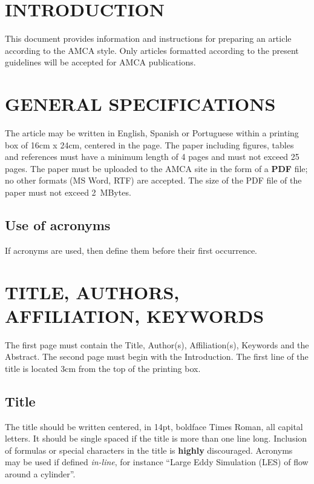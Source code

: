 \documentclass[oneside,a4paper,english,links]{amca}
\begin{document}
\section{INTRODUCTION}
This document provides information and instructions for preparing an
article according to the AMCA style. Only articles formatted according to
the present guidelines will be accepted for AMCA publications. 

\section{GENERAL SPECIFICATIONS}

The article may be written in English, Spanish or Portuguese within a
printing box of 16cm x 24cm, centered in the page. The paper including
figures, tables and references must have a minimum length of 4 pages
and must not exceed 25 pages. The paper must be uploaded to the AMCA
site in the form of a \textbf{PDF} file; no other formats (MS Word,
RTF) are accepted. The size of the PDF file of the paper must not
exceed 2~MBytes.

\subsection{Use of acronyms}

If acronyms are used, then define them before their first
occurrence. 

\section{TITLE, AUTHORS, AFFILIATION, KEYWORDS}

The first page must contain the Title, Author(s), Affiliation(s),
Keywords and the Abstract. The second page must begin with the
Introduction. The first line of the title is located 3cm from the top
of the printing box. 

\subsection{Title}

The title should be written centered, in 14pt, boldface Times Roman,
all capital letters. It should be single spaced if the title is more
than one line long. Inclusion of formulas or special characters in the
title is \textbf{highly} discouraged. Acronyms may be used if defined
\emph{in-line}, for instance ``Large Eddy Simulation (LES) of
flow around a cylinder''.
\end{document}
